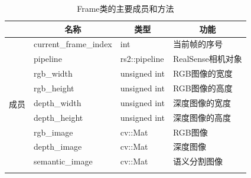 \begin{table}[htb]
	\centering
	\caption{Frame类的主要成员和方法}
	\label{table:Frame}
	\begin{tabular}{|l|m{3.5cm}|m{3.5cm}|m{5cm}|}
		\hline
		                                           & \multicolumn{1}{c|}{名称}                         & \multicolumn{1}{c|}{类型}                       & \multicolumn{1}{c|}{功能}                 \\ \hline
		\multicolumn{1}{|c|}{\multirow{12}{*}{成员}} & \centering\arraybackslash current\_frame\_index & \centering\arraybackslash int                 & \centering\arraybackslash 当前帧的序号        \\ \cline{2-4}
		\multicolumn{1}{|c|}{}                     & \centering\arraybackslash pipeline              & \centering\arraybackslash rs2::pipeline       & \centering\arraybackslash RealSense相机对象 \\ \cline{2-4}
		\multicolumn{1}{|c|}{}                     & \centering\arraybackslash rgb\_width            & \centering\arraybackslash unsigned int        & \centering\arraybackslash RGB图像的宽度      \\ \cline{2-4}
		\multicolumn{1}{|c|}{}                     & \centering\arraybackslash rgb\_height           & \centering\arraybackslash unsigned int        & \centering\arraybackslash RGB图像的高度      \\ \cline{2-4}
		\multicolumn{1}{|c|}{}                     & \centering\arraybackslash depth\_width          & \centering\arraybackslash unsigned int        & \centering\arraybackslash 深度图像的宽度       \\ \cline{2-4}
		\multicolumn{1}{|c|}{}                     & \centering\arraybackslash depth\_height         & \centering\arraybackslash unsigned int        & \centering\arraybackslash 深度图像的高度       \\ \cline{2-4}
		\multicolumn{1}{|c|}{}                     & \centering\arraybackslash rgb\_image            & \centering\arraybackslash cv::Mat             & \centering\arraybackslash RGB图像         \\ \cline{2-4}
		\multicolumn{1}{|c|}{}                     & \centering\arraybackslash depth\_image          & \centering\arraybackslash cv::Mat             & \centering\arraybackslash 深度图像          \\ \cline{2-4}
		\multicolumn{1}{|c|}{}                     & \centering\arraybackslash semantic\_image       & \centering\arraybackslash cv::Mat             & \centering\arraybackslash 语义分割图像        \\ \cline{2-4}

\end{tabular}
\end{table}
